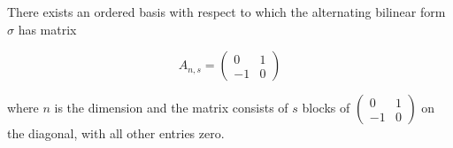 There exists an ordered basis with respect to which the alternating bilinear form $\sigma$ has matrix

$$A_{n,s} = \begin{pmatrix}
0 & 1 \\
-1 & 0
\end{pmatrix}$$

where $n$ is the dimension and the matrix consists of $s$ blocks of $\begin{pmatrix} 0 & 1 \\ -1 & 0 \end{pmatrix}$ on the diagonal, with all other entries zero.
